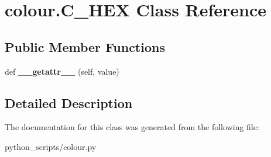 \hypertarget{classcolour_1_1C__HEX}{}\section{colour.\+C\+\_\+\+H\+E\+X Class Reference}
\label{classcolour_1_1C__HEX}
\subsection*{Public Member Functions}
\begin{DoxyCompactItemize}
\item 
\hypertarget{classcolour_1_1C__HEX_adb239df1b02b06e34849cbd4b30af9f1}{}def {\bfseries \+\_\+\+\_\+getattr\+\_\+\+\_\+} (self, value)\label{classcolour_1_1C__HEX_adb239df1b02b06e34849cbd4b30af9f1}

\end{DoxyCompactItemize}


\subsection{Detailed Description}
 

The documentation for this class was generated from the following file\+:\begin{DoxyCompactItemize}
\item 
python\+\_\+scripts/colour.\+py\end{DoxyCompactItemize}
